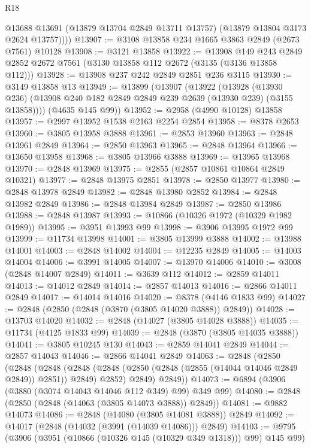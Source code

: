 \begin{lexlean}{R18}
\begin{coremodule}
          @13688
          @13691
          (@13879 @13704 @2849 @13711 @13757)
          (@13879 @13804 @3173 @2624 @13757))))
@13907 := @3108 @13858 @234 @1665 @3863 @2849 (@2673 @7561) @10128
@13908 := @3121 @13858
@13922 := @13908
    @149
    @243
    @2849
    @2852
    @2672
    @7561
    (@3130 @13858 @112 @2672 (@3135 (@3136 @13858 @112)))
@13928 := @13908 @237 @242 @2849 @2851 @236 @3115
@13930 := @3149 @13858 @13
@13949 := @13899
    (@13907
      (@13922
        (@13928
          (@13930 @236)
          (@13908 @240 @182 @2849 @2849 @239 @2639 (@13930 @239) (@3155 @13858))))
      (@4635 @145 @99))
@13952 := @2958 (@4990 @10128) @13858
@13957 := @2997 @13952 @1538 @2163 @2254 @2854
@13958 := @8378 @2653
@13960 := @3805 @13958 @3888
@13961 := @2853 @13960
@13963 := @2848 @13961 @2849
@13964 := @2850 @13963
@13965 := @2848 @13964
@13966 := @13650 @13958
@13968 := @3805 @13966 @3888
@13969 := @13965 @13968
@13970 := @2848 @13969
@13975 := @2855 (@2857 @10861 @10864 @2849 @10321)
@13977 := @2848 @13975 @2851
@13978 := @2850 @13977
@13980 := @2848 @13978 @2849
@13982 := @2848 @13980 @2852
@13984 := @2848 @13982 @2849
@13986 := @2848 @13984 @2849
@13987 := @2850 @13986
@13988 := @2848 @13987
@13993 := @10866 (@10326 @1972 (@10329 @1982 @1989))
@13995 := @3951 @13993 @99
@13998 := @3906 @13995 @1972 @99
@13999 := @11734 @13998
@14001 := @3805 @13999 @3888
@14002 := @13988 @14001
@14003 := @2848 @14002
@14004 := @12235 @2849
@14005 := @14003 @14004
@14006 := @3991 @14005
@14007 := @13970 @14006
@14010 := @3008 (@2848 @14007 @2849)
@14011 := @3639 @112
@14012 := @2859 @14011
@14013 := @14012 @2849
@14014 := @2857 @14013
@14016 := @2866 @14011 @2849
@14017 := @14014 @14016
@14020 := @8378 (@4146 @1833 @99)
@14027 := @2848 (@2850 (@2848 (@3870 (@3805 @14020 @3888)) @2849))
@14028 := @13703 @14020
@14032 := @2848 (@14027 (@3805 @14028 @3888))
@14035 := @11734 (@4125 @1833 @99)
@14039 := @2848 (@3870 (@3805 @14035 @3888))
@14041 := @3805 @10245 @130
@14043 := @2859 @14041 @2849
@14044 := @2857 @14043
@14046 := @2866 @14041 @2849
@14063 := @2848
    (@2850
      (@2848
        (@2848
          (@2848 (@2848 (@2850 (@2848 (@2855 (@14044 @14046 @2849 @2849)) @2851)) @2849) @2852)
          @2849)
        @2849))
@14073 := @6894 (@3906 (@3880 (@3074 @14043 @14046 @112 @349) @99) @349 @99)
@14080 := @2848 (@2850 (@2848 (@14063 (@3805 @14073 @3888)) @2849))
@14081 := @9882 @14073
@14086 := @2848 (@14080 (@3805 @14081 @3888)) @2849
@14092 := @14017 (@2848 (@14032 (@3991 (@14039 @14086))) @2849)
@14103 := @9795 (@3906 (@3951 (@10866 (@10326 @145 (@10329 @349 @1318))) @99) @145 @99)

\end{coremodule}
\end{lexlean}
